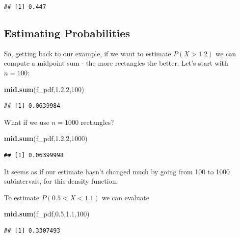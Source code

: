 \documentclass[
]{book}
\newenvironment{Shaded}{\begin{snugshade}}{\end{snugshade}}
\newcommand{\DecValTok}[1]{\textcolor[rgb]{0.00,0.00,0.81}{#1}}
\newcommand{\FloatTok}[1]{\textcolor[rgb]{0.00,0.00,0.81}{#1}}
\newcommand{\FunctionTok}[1]{\textcolor[rgb]{0.13,0.29,0.53}{\textbf{#1}}}
\newcommand{\NormalTok}[1]{#1}
\theoremstyle{definition}
\theoremstyle{definition}
\theoremstyle{definition}
\theoremstyle{definition}
\theoremstyle{remark}
\begin{document}
\begin{verbatim}
## [1] 0.447
\end{verbatim}

\subsection*{Estimating Probabilities}\label{estimating-probabilities}

So, getting back to our example, if we want to estimate \(P(X > 1.2)\) we can compute a midpoint sum - the more rectangles the better. Let's start with \(n = 100\):

\begin{Shaded}
\begin{Highlighting}[]
\FunctionTok{mid.sum}\NormalTok{(f\_pdf,}\FloatTok{1.2}\NormalTok{,}\DecValTok{2}\NormalTok{,}\DecValTok{100}\NormalTok{)}
\end{Highlighting}
\end{Shaded}

\begin{verbatim}
## [1] 0.0639984
\end{verbatim}

What if we use \(n = 1000\) rectangles?

\begin{Shaded}
\begin{Highlighting}[]
\FunctionTok{mid.sum}\NormalTok{(f\_pdf,}\FloatTok{1.2}\NormalTok{,}\DecValTok{2}\NormalTok{,}\DecValTok{1000}\NormalTok{)}
\end{Highlighting}
\end{Shaded}

\begin{verbatim}
## [1] 0.06399998
\end{verbatim}

It seems as if our estimate hasn't changed much by going from 100 to 1000 subintervals, for this density function.

To estimate \(P(0.5 < X < 1.1)\) we can evaluate

\begin{Shaded}
\begin{Highlighting}[]
\FunctionTok{mid.sum}\NormalTok{(f\_pdf,}\FloatTok{0.5}\NormalTok{,}\FloatTok{1.1}\NormalTok{,}\DecValTok{100}\NormalTok{)}
\end{Highlighting}
\end{Shaded}

\begin{verbatim}
## [1] 0.3307493
\end{verbatim}
\end{document}
